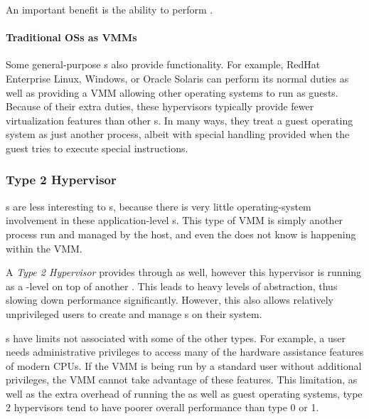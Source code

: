 An important benefit is the ability to perform .

\paragraph{Traditional OSs as VMMs}\label{par:Traditional_OS_VMM}
Some general-purpose s also provide  functionality.
For example, RedHat Enterprise Linux, Windows, or Oracle Solaris can perform its normal duties as well as providing a VMM allowing other operating systems to run as guests.
Because of their extra duties, these hypervisors typically provide fewer virtualization features than other s.
In many ways, they treat a guest operating system as just another process, albeit with special handling provided when the guest tries to execute special instructions.

\subsubsection{Type 2 Hypervisor}\label{subsubsec:Type2_Hypervisor}
s are less interesting to s, because there is very little operating-system involvement in these application-level s.
This type of VMM is simply another process run and managed by the host, and even the  does not know  is happening within the VMM.\@

\begin{definition}\label{def:Type2_Hypervisor}
  A \emph{Type 2 Hypervisor} provides  through  as well, however this hypervisor is running as a -level  on top of another .
  This leads to heavy levels of abstraction, thus slowing down performance significantly.
  However, this also allows relatively unprivileged users to create and manage s on their system.
\end{definition}

s have limits not associated with some of the other types.
For example, a user needs administrative privileges to access many of the hardware assistance features of modern CPUs.
If the VMM is being run by a standard user without additional privileges, the VMM cannot take advantage of these features.
This limitation, as well as the extra overhead of running the  as well as guest operating systems, type 2 hypervisors tend to have poorer overall performance than type 0 or 1.

